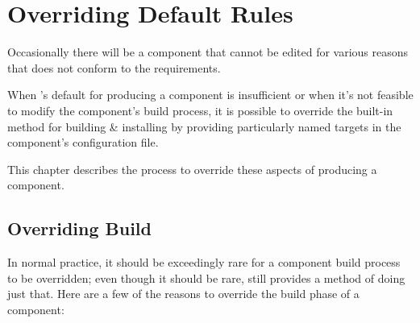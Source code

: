 %
%
%
%
\chapter{Overriding Default Rules} \label{chap:overriding}

Occasionally there will be a component \makefile that cannot be edited
for various reasons that does not conform to the \lmsbw requirements.

When \lmsbw's default for producing a component is insufficient or
when it's not feasible to modify the component's build process, it is
possible to override the built-in method for building \& installing by
providing particularly named targets in the component's configuration
file.

This chapter describes the process to override these aspects of
producing a component.

\section{Overriding Build}\label{overriding:overriding-build}

In normal practice, it should be exceedingly rare for a component
build process to be overridden; even though it should be rare, \lmsbw
still provides a method of doing just that.  Here are a few of the
reasons to override the build phase of a component:

